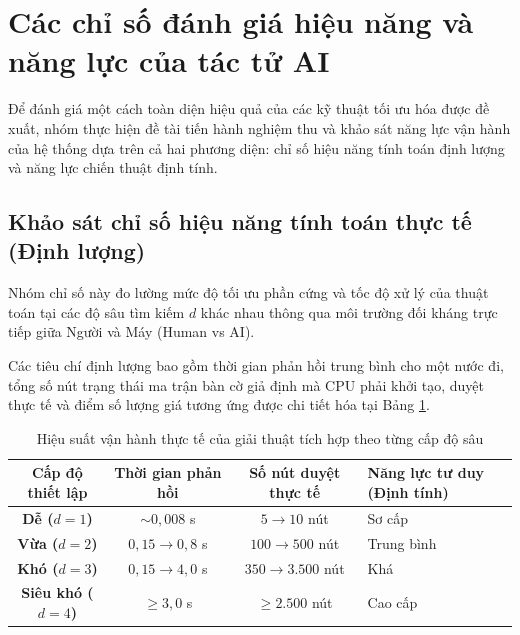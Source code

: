\section{Các chỉ số đánh giá hiệu năng và năng lực của tác tử AI}

Để đánh giá một cách toàn diện hiệu quả của các kỹ thuật tối ưu hóa được đề xuất, nhóm thực hiện đề tài tiến hành nghiệm thu và khảo sát năng lực vận hành của hệ thống dựa trên cả hai phương diện: chỉ số hiệu năng tính toán định lượng và năng lực chiến thuật định tính.

\subsection{Khảo sát chỉ số hiệu năng tính toán thực tế (Định lượng)}
Nhóm chỉ số này đo lường mức độ tối ưu phần cứng và tốc độ xử lý của thuật toán tại các độ sâu tìm kiếm $d$ khác nhau thông qua môi trường đối kháng trực tiếp giữa Người và Máy (Human vs AI). 

Các tiêu chí định lượng bao gồm thời gian phản hồi trung bình cho một nước đi, tổng số nút trạng thái ma trận bàn cờ giả định mà CPU phải khởi tạo, duyệt thực tế và điểm số lượng giá tương ứng được chi tiết hóa tại Bảng \ref{tab:hieunang_thuc_te}.

\begin{table}[!htbp]
	\centering
	\renewcommand{\arraystretch}{1.3}
	\caption{Hiệu suất vận hành thực tế của giải thuật tích hợp theo từng cấp độ sâu}
	\label{tab:hieunang_thuc_te}
	\begin{tabular}{|c|c|c|l|}
		\hline
		\textbf{Cấp độ thiết lập} & \textbf{Thời gian phản hồi} & \textbf{Số nút duyệt thực tế} & \textbf{Năng lực tư duy (Định tính)} \\ \hline
		\textbf{Dễ ($d=1$)} & $\sim 0,008$ s & $5 \to 10$ nút & Sơ cấp\\ \hline
		\textbf{Vừa ($d=2$)} & $0,15 \to 0,8$ s & $100 \to 500$ nút & Trung bình\\ \hline
		\textbf{Khó ($d=3$)} & $0,15 \to 4,0$ s & $350 \to 3.500$ nút & Khá \\ \hline
		\textbf{Siêu khó ($d=4$)} & $\ge 3,0$ s & $\ge 2.500$ nút  & Cao cấp \\ \hline
	\end{tabular}
\end{table}

